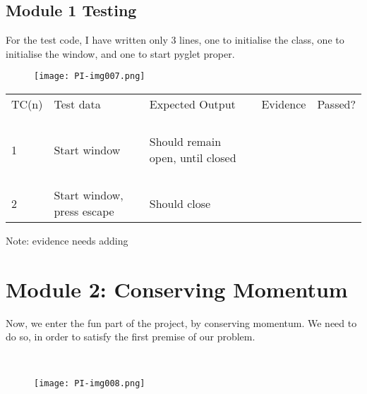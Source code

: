 \documentclass{article}
\begin{document}
\bigskip

\subsection{Module 1 Testing}
For the test code, I have written only 3 lines, one to initialise the class, one to initialise the window, and one to
start pyglet proper.



\begin{figure}
\texttt{[image: PI-img007.png]}\end{figure}

\bigskip


\bigskip


\bigskip

\begin{center}
\tablefirsthead{}
\tablehead{}
\tabletail{}
\tablelasttail{}
\begin{supertabular}{m{1.0879999cm}m{5.303cm}m{4.5940003cm}m{3.1cm}m{1.915cm}}
TC(n) &
Test data &
Expected Output &
Evidence &
Passed?\\
1 &
Start window &
Should remain open, until closed &
~
 &
~

~
\\
2 &
Start window, press escape &
Should close &
~
 &
~
\\
\end{supertabular}
\end{center}

\bigskip


\bigskip

Note: evidence needs adding


\bigskip


\bigskip

\section{Module 2: Conserving Momentum}
Now, we enter the fun part of the project, by conserving momentum. We need to do so, in order to satisfy the first
premise of our problem.

\ 

\begin{figure}
\texttt{[image: PI-img008.png]}\end{figure}

\bigskip


\bigskip


\bigskip
\end{document}
